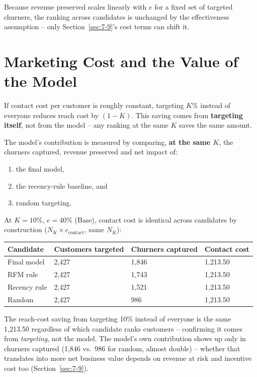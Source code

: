 Because revenue preserved scales linearly with $e$ for a fixed set of targeted churners, the ranking across candidates is unchanged by the effectiveness assumption -- only Section~\ref{sec:7-9}'s cost terms can shift it.

\section{Marketing Cost and the Value of the Model}
\label{sec:7-8}

If contact cost per customer is roughly constant, targeting $K\%$ instead of everyone reduces reach cost by $(1 - K)$. This saving comes from \textbf{targeting itself}, not from the model -- any ranking at the same $K$ saves the same amount.

The model's contribution is measured by comparing, \textbf{at the same $K$}, the churners captured, revenue preserved and net impact of:
\begin{enumerate}
    \item the final model,
    \item the recency-rule baseline, and
    \item random targeting.
\end{enumerate}

At $K=10\%$, $e=40\%$ (Base), contact cost is identical across candidates by construction ($N_K \times c_{\text{contact}}$, same $N_K$):

\begin{center}
\begin{tabular}{@{}p{2.8cm}p{3cm}p{3cm}p{2.6cm}@{}}
    \toprule
    Candidate & Customers targeted & Churners captured & Contact cost \\
    \midrule
    Final model & 2,427 & 1,846 & 1,213.50 \\
    RFM rule & 2,427 & 1,743 & 1,213.50 \\
    Recency rule & 2,427 & 1,521 & 1,213.50 \\
    Random & 2,427 & 986 & 1,213.50 \\
    \bottomrule
\end{tabular}
\end{center}

The reach-cost saving from targeting 10\% instead of everyone is the same 1,213.50 regardless of which candidate ranks customers -- confirming it comes from \emph{targeting}, not the model. The model's own contribution shows up only in churners captured (1,846 vs.\ 986 for random, almost double) -- whether that translates into more net business value depends on revenue at risk and incentive cost too (Section~\ref{sec:7-9}).

